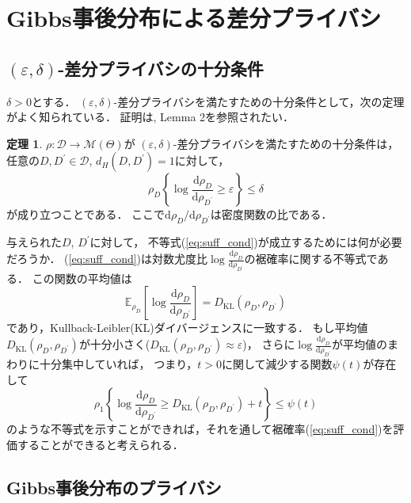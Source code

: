 \documentclass{jarticle}
\newcommand{\dd}{\mathrm{d}}
\theoremstyle{definition}
\newtheorem{thm}{定理}
\begin{document}
\section{Gibbs事後分布による差分プライバシ}

\subsection{$(\varepsilon,\delta)$-差分プライバシの十分条件}

$\delta>0$とする．
$(\varepsilon, \delta)$-差分プライバシを満たすための十分条件として，次の定理がよく知られている．
証明は\cite{Hall2013}, Lemma 2を参照されたい．
\begin{thm}
$\rho: \mathcal{D} \to \mathcal{M}(\Theta)$が
$(\varepsilon, \delta)$-差分プライバシを満たすための十分条件は，
任意の$D, D^\prime \in \mathcal{D}$, $d_H(D, D^\prime)=1$に対して，
\begin{equation}
\rho_D \left \{ \log \frac{\dd \rho_D}{\dd \rho_{D^\prime}} \geq \varepsilon \right \} \leq \delta
\label{eq:suff_cond}
\end{equation}
が成り立つことである．
ここで$\dd \rho_D / \dd \rho_{D^\prime}$は密度関数の比である．
\end{thm}

与えられた$D$, $D^\prime$に対して，
不等式(\ref{eq:suff_cond})が成立するためには何が必要だろうか．
(\ref{eq:suff_cond})は対数尤度比$\log \frac{\dd \rho_D}{\dd \rho_{D^\prime}}$の裾確率に関する不等式である．
この関数の平均値は
\begin{equation}
\mathbb{E}_{\rho_D} \left[ \log \frac{\dd \rho_D}{\dd \rho_{D^\prime}} \right] = D_{\mathrm{KL}}(\rho_D, \rho_{D^\prime})
\end{equation}
であり，Kullback-Leibler(KL)ダイバージェンスに一致する．
もし平均値$D_{\mathrm{KL}}(\rho_D, \rho_{D^\prime})$が十分小さく($D_{\mathrm{KL}}(\rho_D, \rho_{D^\prime})\approx \varepsilon$)，
さらに$\log \frac{\dd \rho_D}{\dd \rho_{D^\prime}}$が平均値のまわりに十分集中していれば，
つまり，$t>0$に関して減少する関数$\psi(t)$が存在して
\begin{equation}
\rho_1 \left \{ \log \frac{\dd \rho_D}{\dd \rho_{D^\prime}} \geq D_{\mathrm{KL}}(\rho_D, \rho_{D^\prime}) + t \right \}
\leq \psi(t)
\label{eq:tail_1}
\end{equation}
のような不等式を示すことができれば，それを通して裾確率(\ref{eq:suff_cond})を評価することができると考えられる．

\subsection{Gibbs事後分布のプライバシ}
\end{document}
